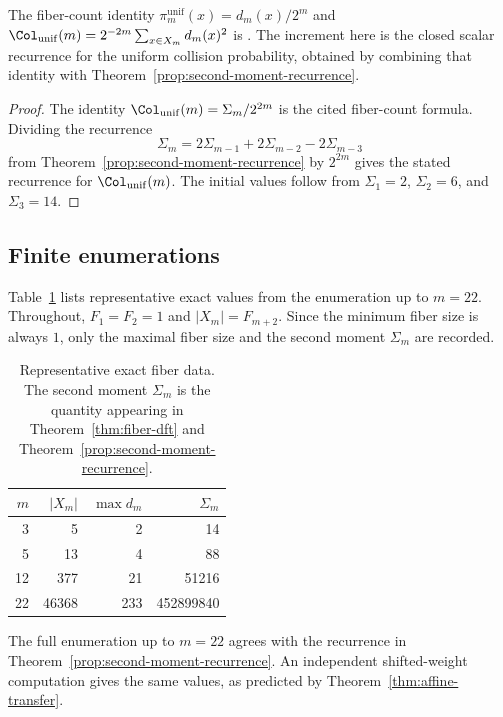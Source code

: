 \begin{remark}
The fiber-count identity
$\pi_m^{\mathrm{unif}}(x)=d_m(x)/2^m$ and
$\Col_{\mathrm{unif}}(m)=2^{-2m}\sum_{x\in X_m}d_m(x)^2$ is
\cite[Proposition~7.5]{MaZhang2026Nonlinearity}. The increment here is the
closed scalar recurrence for the uniform collision probability, obtained by
combining that identity with Theorem~\ref{prop:second-moment-recurrence}.
\end{remark}

\begin{proof}
The identity $\Col_{\mathrm{unif}}(m)=\Sigma_m/2^{2m}$ is the cited
fiber-count formula. Dividing the recurrence
\[
\Sigma_m=2\Sigma_{m-1}+2\Sigma_{m-2}-2\Sigma_{m-3}
\]
from Theorem~\ref{prop:second-moment-recurrence} by $2^{2m}$ gives the stated
recurrence for $\Col_{\mathrm{unif}}(m)$. The initial values follow from
$\Sigma_1=2$, $\Sigma_2=6$, and $\Sigma_3=14$.
\end{proof}

\subsection{Finite enumerations}\label{sec:fiber-enumerations}

Table~\ref{tab:sanity-fibers} lists representative exact values from the enumeration up to $m=22$. Throughout, $F_1=F_2=1$ and $|X_m|=F_{m+2}$. Since the minimum fiber size is always $1$, only the maximal fiber size and the second moment $\Sigma_m$ are recorded.

\begin{table}[t]
\centering
\caption{Representative exact fiber data. The second moment $\Sigma_m$ is the quantity appearing in Theorem~\ref{thm:fiber-dft} and Theorem~\ref{prop:second-moment-recurrence}.}
\label{tab:sanity-fibers}
\renewcommand{\arraystretch}{1.15}
\begin{tabular}{rrrr}
\toprule
$m$ & $|X_m|$ & $\max d_m$ & $\Sigma_m$ \\
\midrule
3 & 5 & 2 & 14 \\
5 & 13 & 4 & 88 \\
12 & 377 & 21 & 51216 \\
22 & 46368 & 233 & 452899840 \\
\bottomrule
\end{tabular}
\end{table}

The full enumeration up to $m=22$ agrees with the recurrence in Theorem~\ref{prop:second-moment-recurrence}. An independent shifted-weight computation gives the same values, as predicted by Theorem~\ref{thm:affine-transfer}.
